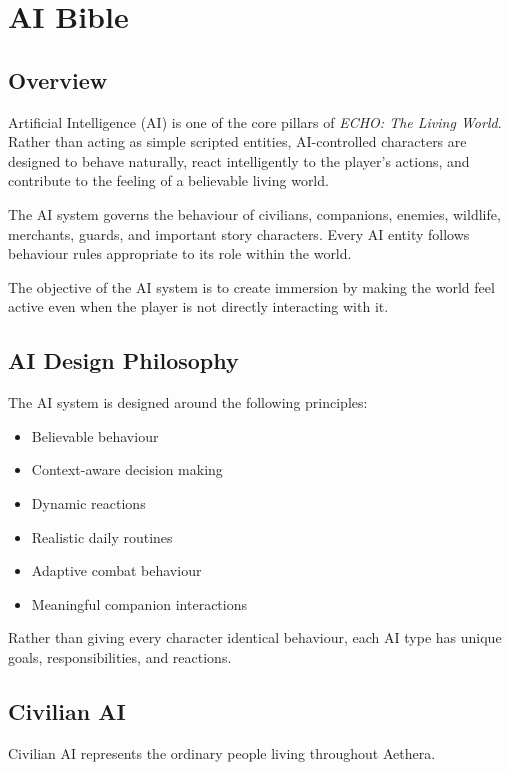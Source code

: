 \chapter{AI Bible}

\section{Overview}

Artificial Intelligence (AI) is one of the core pillars of \textit{ECHO: The Living World}. Rather than acting as simple scripted entities, AI-controlled characters are designed to behave naturally, react intelligently to the player's actions, and contribute to the feeling of a believable living world.

The AI system governs the behaviour of civilians, companions, enemies, wildlife, merchants, guards, and important story characters. Every AI entity follows behaviour rules appropriate to its role within the world.

The objective of the AI system is to create immersion by making the world feel active even when the player is not directly interacting with it.

\section{AI Design Philosophy}

The AI system is designed around the following principles:

\begin{itemize}
    \item Believable behaviour
    \item Context-aware decision making
    \item Dynamic reactions
    \item Realistic daily routines
    \item Adaptive combat behaviour
    \item Meaningful companion interactions
\end{itemize}

Rather than giving every character identical behaviour, each AI type has unique goals, responsibilities, and reactions.

\section{Civilian AI}

Civilian AI represents the ordinary people living throughout Aethera.

